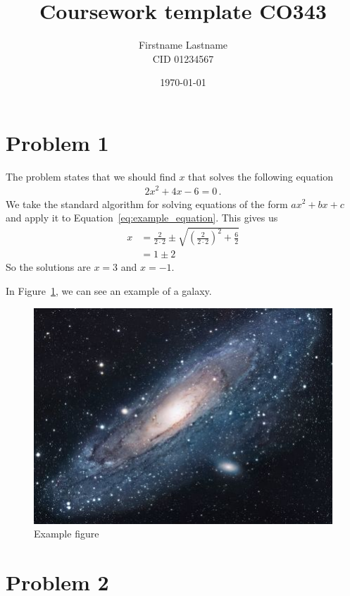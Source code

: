 \documentclass{article}
\title{Coursework template CO343}
\author{Firstname Lastname \\ CID 01234567}
\date{\today}
\begin{document}
\maketitle

\section{Problem 1}
The problem states that we should find $x$ that solves the following equation
\begin{align}
    \label{eq:example_equation} %
    2 x^2 + 4 x - 6 = 0 \,.
\end{align}
We take the standard algorithm for solving equations of the form $a x^2 + bx + c$ and apply it to Equation~\ref{eq:example_equation}. This gives us
\begin{align}
    x 
    &= \frac{2}{2 \cdot 2} \pm \sqrt{\left( \frac{2}{2 \cdot 2} \right)^2 + \frac{6}{2} } \\
    &= 1 \pm 2
\end{align}
So the solutions are $x=3$ and $x = -1$.

In Figure~\ref{fig:universe}, we can see an example of a galaxy.
\begin{figure}[h!]
    \centering
    \includegraphics[scale=2]{universe.jpg}
    \caption{Example figure}
    \label{fig:universe}
\end{figure}


\pagebreak
\section{Problem 2}
\end{document}
